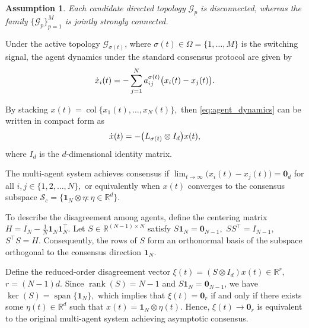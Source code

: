 \documentclass[conference]{IEEEtran}
\newtheorem{asum}{Assumption}
\begin{document}
	\begin{asum}\label{ass:joint}
		Each candidate directed topology $\mathcal G_p$ is disconnected, whereas the family
		$\{\mathcal G_p\}_{p=1}^{M}$ is jointly strongly connected.
	\end{asum}
	
	Under the active topology $\mathcal G_{\sigma(t)}$, where
	$\sigma(t)\in\Omega=\{1,\ldots,M\}$ is the switching signal, the agent dynamics under the standard consensus protocol are
	given by
	\vspace{-0.2\baselineskip}
	\begin{equation}
		\dot{x}_i(t)
		=
		-\sum_{j=1}^{N}
		a_{ij}^{\sigma(t)}
		\bigl(x_i(t)-x_j(t)\bigr).
		\label{eq:agent_dynamics}
		\vspace{-0.2\baselineskip}		
	\end{equation}
	
	By stacking
	$
	x(t)=\operatorname{col}\{x_1(t),\ldots,x_N(t)\},
	$
	then \eqref{eq:agent_dynamics} can be written in compact form as
	\vspace{-0.2\baselineskip}
	\begin{equation}
		\dot{x}(t)
		=
		-\bigl(L_{\sigma(t)}\otimes I_d\bigr)x(t),
		\label{eq:original_system}		
		\vspace{-0.2\baselineskip}
	\end{equation}
	where $I_d$ is the $d$-dimensional identity matrix.
	
	The multi-agent system achieves consensus if
	$
	\lim_{t\to\infty}
	\bigl(x_i(t)-x_j(t)\bigr)
	=
	\mathbf 0_d
	$ for all $ i,j\in\{1,2,\ldots,N\},$ or equivalently when $x(t)$ converges to the consensus subspace $\mathcal{S}_c=\{\mathbf{1}_N\otimes\eta:\eta\in\mathbb{R}^d\}$.
	
	To describe the disagreement among agents, define the centering
	matrix
	$
	H
	=
	I_N-\frac{1}{N}\mathbf 1_N\mathbf 1_N^\top.
	$
	Let $S\in\mathbb R^{(N-1)\times N}$ satisfy
	$
	S\mathbf 1_N=\mathbf 0_{N-1},
	$
	$
	SS^\top=I_{N-1},
	$
	$
	S^\top S=H.
	\label{eq:S_properties}
	$
	Consequently, the rows of $S$ form an orthonormal basis of the subspace
	orthogonal to the consensus direction $\mathbf 1_N$.
	
	Define the reduced-order disagreement vector
	$
	\xi(t)
	=
	(S\otimes I_d)x(t)
	\in\mathbb R^r,
	$
	$
	r=(N-1)d.
	\label{eq:xi_definition}
	$
	Since $\operatorname{rank}(S)=N-1$ and $S \mathbf1_N=\mathbf 0_{N-1}$, we have
	$
	\ker(S)
	=
	\operatorname{span}\{\mathbf 1_N\},
	$
	which implies that \(\xi(t)=\mathbf 0_r\) if and only if there exists some \(\eta(t)\in\mathbb R^d\) such that \(x(t)=\mathbf 1_N\otimes\eta(t)\).
	Hence, $\xi(t)\to\mathbf 0_r$ is
	equivalent to the original multi-agent system achieving asymptotic consensus.
	
\end{document}
